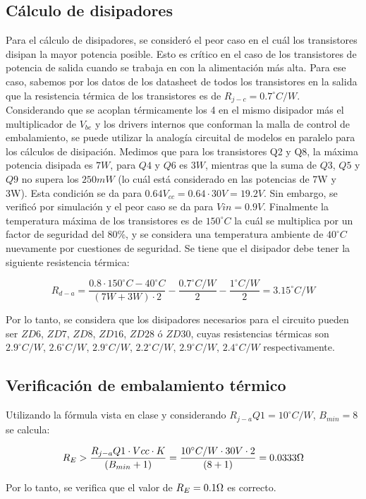 \subsection{Cálculo de disipadores}

\par Para el cálculo de disipadores, se consideró el peor caso en el cuál los transistores disipan la mayor potencia posible. Esto es crítico en el caso de los transistores de potencia de salida cuando se trabaja en con la alimentación más alta. Para ese caso, sabemos por los datos de los datasheet de todos los transistores en la salida que la resistencia térmica de los transistores es de $R_{j-c} = 0.7^\circ C/W$. Considerando que se acoplan térmicamente los 4 en el mismo disipador más el multiplicador de $V_{be}$ y los drivers internos que conforman la malla de control de embalamiento, se puede utilizar la analogía circuital de modelos en paralelo para los cálculos de disipación. Medimos que para los transistores Q2 y Q8, la máxima potencia disipada es $7W$, para $Q4$ y $Q6$ es $3W$, mientras que la suma de $Q3$, $Q5$ y $Q9$ no supera los $250mW$ (lo cuál está considerado en las potencias de 7W y 3W). Esta condición se da para $0.64 V_{cc} = 0.64 \cdot 30V = 19.2V$. Sin embargo, se verificó por simulación y el peor caso se da para $Vin = 0.9V$. Finalmente la temperatura máxima de los transistores es de $150^\circ C$ la cuál se multiplica por un factor de seguridad del 80\%, y se considera una temperatura ambiente de $40^\circ C$ nuevamente por cuestiones de seguridad. Se tiene que el disipador debe tener la siguiente resistencia térmica:

\begin{equation}
    R_{d-a} = \frac{0.8 \cdot 150^\circ C-40^\circ C}{(7W+3W) \cdot 2} - \frac{0.7^\circ C/W}{2} - \frac{1^\circ C/W}{2} = 3.15^\circ C/W
\end{equation}

Por lo tanto, se considera que los disipadores necesarios para el circuito pueden ser $ZD6$, $ZD7$, $ZD8$, $ZD16$, $ZD28$ ó $ZD30$, cuyas resistencias térmicas son $2.9^\circ C/W$, $2.6^\circ C/W$, $2.9^\circ C/W$, $2.2^\circ C/W$, $2.9^\circ C/W$, $2.4^\circ C/W$ respectivamente.


\subsection{Verificación de embalamiento térmico}

\par Utilizando la fórmula vista en clase y considerando $R_{j-a}Q1 = 10^\circ C/W$, $B_{min} = 8$ se calcula:

\begin{equation}
    R_E > \frac{R_{j-a}Q1 \cdot Vcc \cdot K}{(B_{min}+1)} = \frac{10^\circ C/W \cdot 30V \cdot 2}{(8+1)} = 0.0333\ohm 
\end{equation}

Por lo tanto, se verifica que el valor de $R_E = 0.1\ohm$ es correcto.